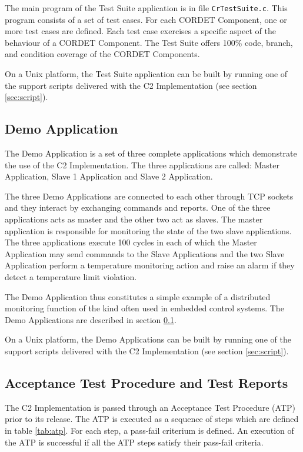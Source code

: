 \documentclass[a4paper,10pt]{article}
\begin{document}
The main program of the Test Suite application is in file \texttt{CrTestSuite.c}. This program consists of a set of test cases. For each CORDET Component, one or more test cases are defined. Each test case exercises a specific aspect of the behaviour of a CORDET Component. The Test Suite offers 100\% code, branch, and condition coverage of the CORDET Components.

On a Unix platform, the Test Suite application can be built by running one of the support scripts delivered with the C2 Implementation (see section \ref{sec:script}). 

\subsection{Demo Application}\label{sec:DemoAppFull}
The Demo Application is a set of three complete applications which demonstrate the use of the C2 Implementation. The three applications are called: Master Application, Slave 1 Application and Slave 2 Application.

The three Demo Applications are connected to each other through TCP sockets and they interact by exchanging commands and reports. One of the three applications acts as master and the other two act as slaves. The master application is responsible for monitoring the state of the two slave applications. The three applications execute 100 cycles in each of which the Master Application may send commands to the Slave Applications and the two Slave Application perform a temperature monitoring action and raise an alarm if they detect a temperature limit violation.

The Demo Application thus constitutes a simple example of a distributed monitoring function of the kind often used in embedded control systems. The Demo Applications are described in section \ref{sec:DemoAppFull}.

On a Unix platform, the Demo Applications can be built by running one of the support scripts delivered with the C2 Implementation (see section \ref{sec:script}). 

\subsection{Acceptance Test Procedure and Test Reports}\label{sec:atp}
The C2 Implementation is passed through an Acceptance Test Procedure (ATP) prior to its release. The ATP is executed as a sequence of steps which are defined in table \ref{tab:atp}. For each step, a pass-fail criterium is defined. An execution of the ATP is successful if all the ATP steps satisfy their pass-fail criteria.
\end{document}
